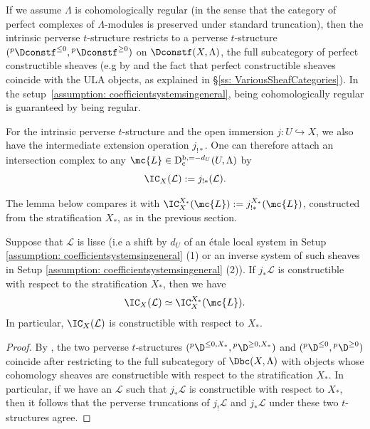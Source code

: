 \documentclass[letterpaper,11pt]{amsart}
\begin{document}
\begin{remark}{\label{rem: perverseconstructibletstructure}}
If we assume $\Lambda$ is cohomologically regular (in the sense that the category of perfect complexes of $\Lambda$-modules is preserved under standard truncation), then the intrinsic perverse $t$-structure restricts to a perverse $t$-structure $(\phantom{}^{p}\Dconstf^{\leq 0},\phantom{}^{p}\Dconstf^{\geq 0})$ on $\Dconstf(X,\Lambda)$, the full subcategory of perfect  constructible sheaves (e.g by \cite[Theorem~1.9]{HansenScholzeRelativePerversity} and the fact that perfect constructible sheaves coincide with the ULA objects, as explained in \S\ref{ss: VariousSheafCategories}). In the setup~\ref{assumption: coefficientsystemsingeneral}, being cohomologically regular is guaranteed by being regular.
\end{remark}


For the intrinsic perverse $t$-structure and the open immersion $j:U\hookrightarrow X$, we also have the intermediate extension operation $j_{!\ast}$. One can therefore attach an intersection complex to any $\mc{L}\in \mathrm{D}^{\mathrm{b}, =-d_U}_\mathrm{c}(U,\Lambda)$ by
\[ \IC_{X}(\mathcal{L}) := j_{!*}(\mathcal{L}).\]

The lemma below compares it with $\IC^{X_\ast}_X(\mc{L}):= j_{!\ast}^{X_\ast}(\mc{L})$, constructed from the stratification $X_\ast$, as in the previous section.
\begin{lemma}\label{lemma: NaturalandStratifiedIC}
Suppose that $\mathcal{L}$ is lisse (i.e a shift by $d_{U}$ of an \'etale local system in Setup \ref{assumption: coefficientsystemsingeneral} (1) or an inverse system of such sheaves in Setup \ref{assumption: coefficientsystemsingeneral} (2)). If $j_{*}\mathcal{L}$ is constructible with respect to the stratification $X_{*}$, then we have
    \[\IC_{X}(\mathcal{L})\simeq \IC^{X_\ast}_X(\mc{L}).\]
    In particular, $\IC_{X}(\mathcal{L})$ is constructible with respect to $X_{*}$.
\end{lemma} 
\begin{proof}
    By \cite[Proposition~2.2.2]{BBD}, the two perverse $t$-structures $(\phantom{}^{p}\D^{\leq 0,X_{*}},  \phantom{}^{p}\D^{\geq 0,X_{*}})$ and $(\phantom{}^{p}\D^{\leq 0},  \phantom{}^{p}\D^{\geq 0})$ coincide after restricting to the full subcategory of $ \Dbc(X,\Lambda)$ with objects whose cohomology sheaves are constructible with respect to the stratification $X_{*}$. In particular, if we have an  $\mathcal{L}$ such that $j_{*}\mathcal{L}$ is constructible with respect to $X_{*}$, then it follows that the perverse truncations of $j_{!}\mathcal{L}$ and $j_*\mathcal{L}$ under these two $t$-structures agree.     
\end{proof}
\end{document}
